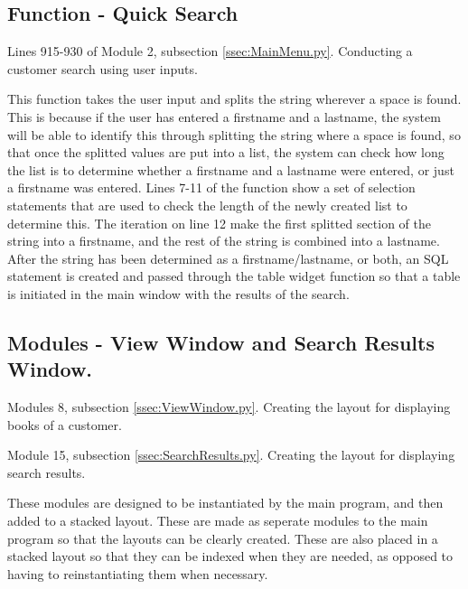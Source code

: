 \subsection{Function - Quick Search}
Lines 915-930 of Module 2, subsection \ref{ssec:MainMenu.py}. Conducting a customer search using user inputs.
\begin{tiny}
\end{tiny}
This function takes the user input and splits the string wherever a space is found. This is because if the user has entered a firstname and a lastname, the system will be able to identify this through splitting the string where a space is found, so that once the splitted values are put into a list, the system can check how long the list is to determine whether a firstname and a lastname were entered, or just a firstname was entered. Lines 7-11 of the function show a set of selection statements that are used to check the length of the newly created list to determine this. The iteration on line 12 make the first splitted section of the string into a firstname, and the rest of the string is combined into a lastname. After the string has been determined as a firstname/lastname, or both, an SQL statement is created and passed through the table widget function so that a table is initiated in the main window with the results of the search.


\subsection{Modules - View Window and Search Results Window.}
Modules 8, subsection \ref{ssec:ViewWindow.py}. Creating the layout for displaying books of a customer.
\begin{tiny}
\end{tiny}

Module 15, subsection \ref{ssec:SearchResults.py}. Creating the layout for displaying search results.
\begin{tiny}
\end{tiny}

These modules are designed to be instantiated by the main program, and then added to a stacked layout. These are made as seperate modules to the main program so that the layouts can be clearly created. These are also placed in a stacked layout so that they can be indexed when they are needed, as opposed to having to reinstantiating them when necessary.



